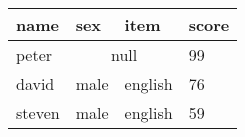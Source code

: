 \documentclass{article}
\begin{document}
\begin{tabular}{l|l|l|l}
    \hline
    name & sex & item & score\\
    \hline
    peter & \multicolumn{2}{c|}{null} & 99\\
    \hline
    david & male & english & 76\\
    \hline
    steven & male & english & 59\\
    \hline
\end{tabular}
\end{document}
